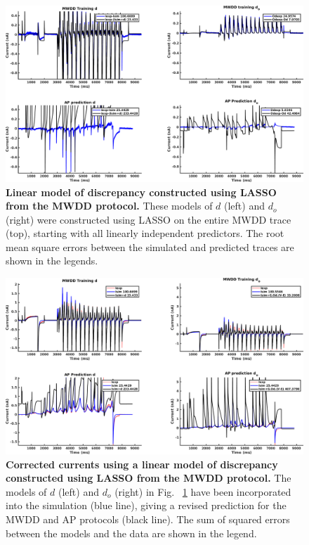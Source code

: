 \documentclass[11pt,a4paper,oneside]{article}
\begin{document}
\clearpage

\begin{figure}[t]
\begin{center}
\includegraphics[scale=0.42]{Figures/LASSO_MWDD_AP_full_discrepancy.png}
\caption{\textbf{Linear model of discrepancy constructed using LASSO from the MWDD protocol.} These models of $d$ (left) and $d_o$ (right) were constructed using LASSO on the entire MWDD trace (top), starting with all linearly independent predictors. The root mean square errors between the simulated and predicted traces are shown in the legends. } 
\label{Fig_LASSO_MWDD_AP_full_discrepancy}
\end{center}
\end{figure}

\begin{figure}[hb]
\begin{center}
\includegraphics[scale=0.42]{Figures/LASSO_MWDD_AP_full_currents.png}
\caption{\textbf{Corrected currents using a linear model of discrepancy constructed using LASSO from the MWDD protocol.} The models of $d$ (left) and $d_o$ (right) in Fig. ~\ref{Fig_LASSO_MWDD_AP_full_discrepancy} have been incorporated into the simulation (blue line), giving a revised prediction for the MWDD and AP protocols (black line). The sum of squared errors between the models and the data are shown in the legend.}
\label{Fig_LASSO_MWDD_AP_full_currents}
\end{center}
\end{figure}
\end{document}

